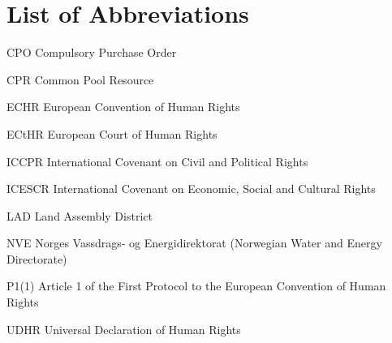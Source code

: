\documentclass[a4paper,twoside,openright,10pt]{thesisPSnPDF}
\makeatletter
\newcommand{\tocfill}{\cleaders\hbox{$\m@th \mkern\@dotsep mu . \mkern\@dotsep mu$}\hfill}
\newcommand{\abbrlabel}[1]{\makebox[3cm][l]{\textbf{#1}\ \tocfill}}
\newenvironment{abbreviations}{\begin{list}{}{\renewcommand{\makelabel}{\abbrlabel}%
        \setlength{\labelwidth}{3cm}\setlength{\leftmargin}{\labelwidth+\labelsep}%
                                              \setlength{\itemsep}{0pt}}}{\end{list}}
\makeatother
\begin{document}
\renewcommand\baselinestretch{1.5}
\baselineskip=24pt




\setcounter{secnumdepth}{4}
\setcounter{tocdepth}{2}



\tableofcontents

%





\section*{List of Abbreviations}

\begin{abbreviations}
\item[CPO]{Compulsory Purchase Order}
\item[CPR]{Common Pool Resource}
\item[ECHR]{European Convention of Human Rights}
\item[ECtHR]{European Court of Human Rights}
\item[ICCPR]{International Covenant on Civil and Political Rights}
\item[ICESCR]{International Covenant on Economic, Social and Cultural Rights}
\item[LAD]{Land Assembly District}
\item[NVE]{Norges Vassdrags- og Energidirektorat (Norwegian Water and Energy \linebreak Directorate)}
\item[P1(1)]{Article 1 of the First Protocol to the European Convention of Human Rights}
\item[UDHR]{Universal Declaration of Human Rights}
\end{abbreviations}

%

\end{document}
